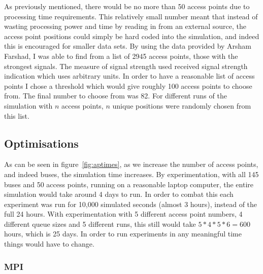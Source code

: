 \documentclass[12pt,a4paper,notitlepage]{article}
\begin{document}
As previously mentioned, there would be no more than 50 access points due to processing time requirements. This relatively small number meant that instead of wasting processing power and time by reading in from an external source, the access point positions could simply be hard coded into the simulation, and indeed this is encouraged for smaller data sets. By using the data provided by Arsham Farshad, I was able to find from a list of 2945 access points, those with the strongest signals. The measure of signal strength used received signal strength indication which uses arbitrary units. In order to have a reasonable list of access points I chose a threshold which would give roughly 100 access points to choose from. The final number to choose from was 82. For different runs of the simulation with $n$ access points, $n$ unique positions were randomly chosen from this list. 

\subsection{Optimisations}

As can be seen in figure~\ref{fig:aptimes}, as we increase the number of access points, and indeed buses, the simulation time increases. By experimentation, with all 145 buses and 50 access points, running on a reasonable laptop computer, the entire simulation would take around 4 days to run. In order to combat this each experiment was run for 10,000 simulated seconds (almost 3 hours), instead of the full 24 hours. With experimentation with 5 different access point numbers, 4 different queue sizes and 5 different runs, this still would take $5 * 4 * 5 * 6 = 600$ hours, which is 25 days. In order to run experiments in any meaningful time things would have to change. 

\subsubsection{MPI}
\end{document}
